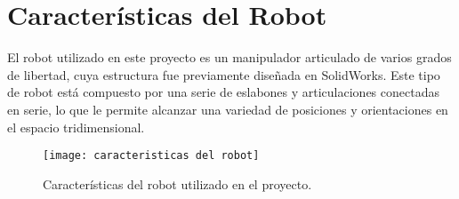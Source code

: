 \section{Características del Robot} \label{sec:caracteristicas_del_robot}

El robot utilizado en este proyecto es un manipulador articulado de varios grados de libertad, cuya estructura fue previamente dise\~nada en SolidWorks. Este tipo de robot est\'a compuesto por una serie de eslabones y articulaciones conectadas en serie, lo que le permite alcanzar una variedad de posiciones y orientaciones en el espacio tridimensional.

\begin{figure}[H]
	\centering
	\texttt{[image: caracteristicas del robot]}
	\caption{Características del robot utilizado en el proyecto.}
	\label{fig:caracteristicas_robot}
\end{figure}


